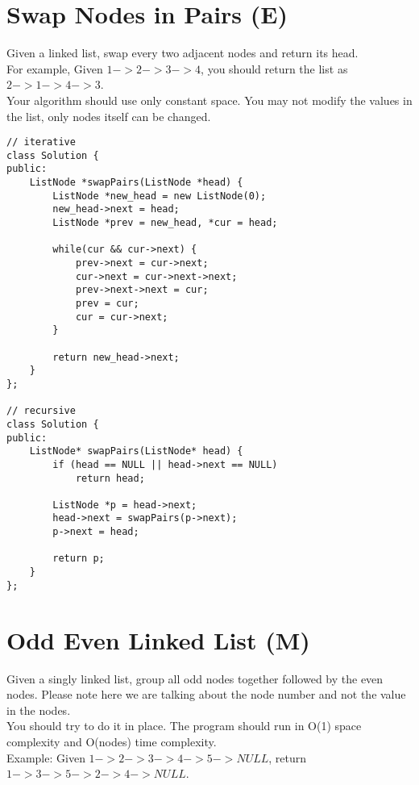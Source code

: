 \section{Swap Nodes in Pairs (E)}
Given a linked list, swap every two adjacent nodes and return its head. \\

For example, Given $1->2->3->4$, you should return the list as $2->1->4->3$. \\

Your algorithm should use only constant space. You may not modify the values in the list, only nodes itself can be changed. \\

\begin{lstlisting}
// iterative
class Solution {
public:
    ListNode *swapPairs(ListNode *head) {
        ListNode *new_head = new ListNode(0);
        new_head->next = head;
        ListNode *prev = new_head, *cur = head;
        
        while(cur && cur->next) {
            prev->next = cur->next;
            cur->next = cur->next->next;
            prev->next->next = cur;
            prev = cur;
            cur = cur->next;
        }
        
        return new_head->next;
    }
};

// recursive
class Solution {
public:
    ListNode* swapPairs(ListNode* head) {
        if (head == NULL || head->next == NULL)
            return head;
        
        ListNode *p = head->next;
        head->next = swapPairs(p->next);
        p->next = head;
        
        return p;
    }
};
\end{lstlisting}


\section{Odd Even Linked List (M)}
Given a singly linked list, group all odd nodes together followed by the even nodes. Please note here we are talking about the node number and not the value in the nodes.\\

You should try to do it in place. The program should run in O(1) space complexity and O(nodes) time complexity.\\

Example:
Given $1->2->3->4->5->NULL$, return $1->3->5->2->4->NULL$.\\

